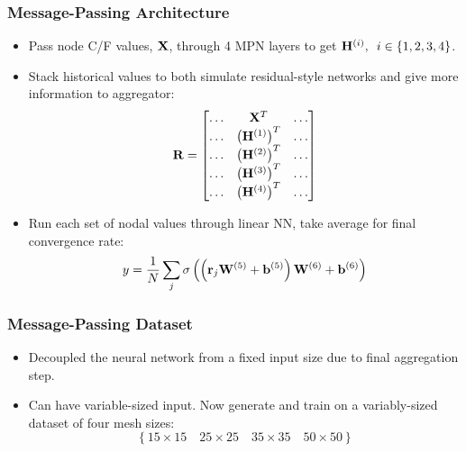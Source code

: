 \documentclass[handout]{beamer}
\renewcommand{\vec}[1]{ {\bf #1} }
\newcommand{\mat}[1]{ \vec{#1} }
\begin{document}
\begin{frame}
  \frametitle{Message-Passing Architecture}
  \begin{itemize}
  \item Pass node C/F values, $\mat{X}$, through 4 MPN layers to get $\mat{H}^{(i)}, \enskip i\in\left\{1,2,3,4\right\}$.
  \item Stack historical values to both simulate residual-style networks and give more information to aggregator:
    \[ \mat{R} =
\begin{bmatrix}
\hdots & \mat{X}^T & \hdots \\
\hdots & \left(\mat{H}^{(1)}\right)^T & \hdots \\
\hdots & \left(\mat{H}^{(2)}\right)^T & \hdots \\
\hdots & \left(\mat{H}^{(3)}\right)^T & \hdots \\
\hdots & \left(\mat{H}^{(4)}\right)^T & \hdots \\
\end{bmatrix} \]
\item Run each set of nodal values through linear NN, take average for final convergence rate:
  \[ y=\frac{1}{N} \sum_j \sigma\left( \left( \vec{r}_j \mat{W}^{(5)} + \vec{b}^{(5)} \right)\mat{W}^{(6)} + \vec{b}^{(6)} \right) \]
  \end{itemize}
\end{frame}


\begin{frame}
  \frametitle{Message-Passing Dataset}
  \begin{itemize}
  \item Decoupled the neural network from a fixed input size due to final aggregation step.
  \item Can have variable-sized input.  Now generate and train on  a variably-sized dataset of four mesh sizes:
  \[ \left\{ 15\times 15 \quad 25\times 25 \quad 35\times 35 \quad 50 \times 50 \right\} \]
  \end{itemize}
\end{frame}
\end{document}
